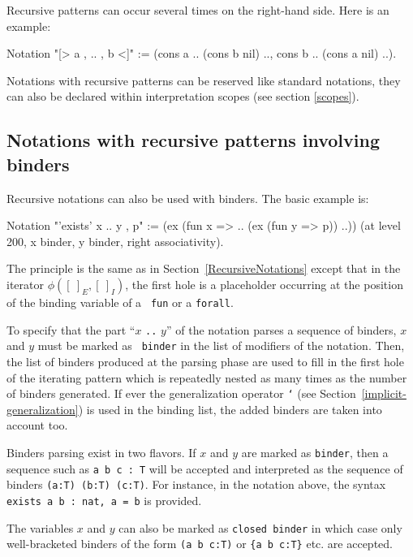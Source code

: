 Recursive patterns can occur several times on the right-hand side.
Here is an example:

\begin{coq_example*}
Notation "[> a , .. , b <]" :=
  (cons a .. (cons b nil) .., cons b .. (cons a nil) ..).
\end{coq_example*}

Notations with recursive patterns can be reserved like standard
notations, they can also be declared within interpretation scopes (see
section \ref{scopes}).

\subsection{Notations with recursive patterns involving binders}

Recursive notations can also be used with binders. The basic example is:

\begin{coq_example*}
Notation "'exists' x .. y , p" := (ex (fun x => .. (ex (fun y => p)) ..))
  (at level 200, x binder, y binder, right associativity).
\end{coq_example*}

The principle is the same as in Section~\ref{RecursiveNotations}
except that in the iterator $\phi([~]_E,[~]_I)$, the first hole is a
placeholder occurring at the position of the binding variable of a {\tt
  fun} or a {\tt forall}.

To specify that the part ``$x$ {\tt ..} $y$'' of the notation
parses a sequence of binders, $x$ and $y$ must be marked as {\tt
  binder} in the list of modifiers of the notation.  Then, the list of
binders produced at the parsing phase are used to fill in the first
hole of the iterating pattern which is repeatedly nested as many times
as the number of binders generated. If ever the generalization
operator {\tt `} (see Section~\ref{implicit-generalization}) is used
in the binding list, the added binders are taken into account too.

Binders parsing exist in two flavors. If $x$ and $y$ are marked as
{\tt binder}, then a sequence such as {\tt a b c : T} will be accepted
and interpreted as the sequence of binders {\tt (a:T) (b:T)
  (c:T)}. For instance, in the notation above, the syntax {\tt exists
  a b : nat, a = b} is provided.

The variables $x$ and $y$ can also be marked as {\tt closed binder} in
which case only well-bracketed binders of the form {\tt (a b c:T)} or
{\tt \{a b c:T\}} etc. are accepted.

